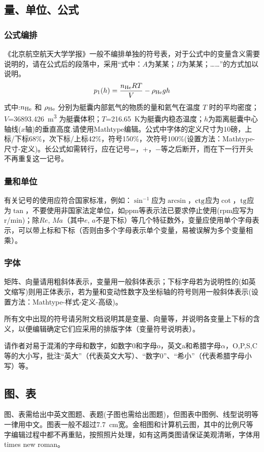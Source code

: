 \documentclass[10.5pt,twocolumn]{jbuaa}
\begin{document}
\subsection{量、单位、公式}
\subsubsection{公式编排}
\label{labSecForm}
《北京航空航天大学学报》一般不编排单独的符号表，对于公式中的变量含义需要说明的，请在公式后的段落中，采用“式中：$A$为某某；$B$为某某；……”的方式加以说明。
\begin{equation}
\label{eqnLabelp}
p_1 (h) = \dfrac{n_{\textnormal{He}}RT}{V}-\rho_{\textnormal{He}}gh
\end{equation}
式中:$n_{\textnormal{He}}$ 和 $\rho_{\textnormal{He}}$ 分别为艇囊内部氦气的物质的量和氦气在温度 $T$ 时的平均密度；
$V$=\SI{36893.426}{\cubic\meter}%
为艇囊体积；$T$=\SI{216.65}{\kelvin}为艇囊内稳态温度；$h$为距离艇囊中心轴线($x$轴)的垂直高度.请使用Mathtype编辑。公式中字体的定义尺寸为10磅，上标/下标68\%，次下标/上标42\%，符号150\%，次符号100\%(设置方法：Mathtype-尺寸-定义)。长公式如需转行，应在记号=，+，$-$等之后断开，而在下一行开头不再重复这一记号。

\subsubsection{量和单位}
有关记号的使用应符合国家标准，例如：$\sin^{-1}$应为$\arcsin$，$\rm ctg$应为$\cot$，$\rm tg$应为$\tan$，不要使用非国家法定单位，如ppm等表示法已要求停止使用(rpm应写为r/min)；除$Re$, $Ma$（其中$e$, $a$不是下标）等几个特征数外，变量应使用单个字母表示，可以带上标和下标（否则由多个字母表示单个变量，易被误解为多个变量相乘）。

\subsubsection{字体}
矩阵、向量请用粗斜体表示，变量用一般斜体表示；下标字母若为说明性的(如英文缩写)则用正体表示，若为量和变动性数字及坐标轴的符号则用一般斜体表示(设置方法：Mathtype-样式-定义-高级)。

所有文中出现的符号请另附文档说明其是变量、向量等，并说明各变量上下标的含义，以便编辑确定它们应采用的排版字体（变量符号说明表）。

请作者对易于混淆的字母和数字，如数字0和字母o，英文a和希腊字母$\alpha$，O,P,S,C等的大小写，批注“英大”（代表英文大写）、“数字0”、“希小”（代表希腊字母小写）等。

\subsection{图、表}
图、表需给出中英文图题、表题(子图也需给出图题)，但图表中图例、线型说明等一律用中文。图表一般不超过7.7\ cm宽。金相图和计算机云图，其中的比例尺等字编辑过程中都不再重贴，按照照片处理，如有这两类图请保证美观清晰，字体用times new roman。
\end{document}

